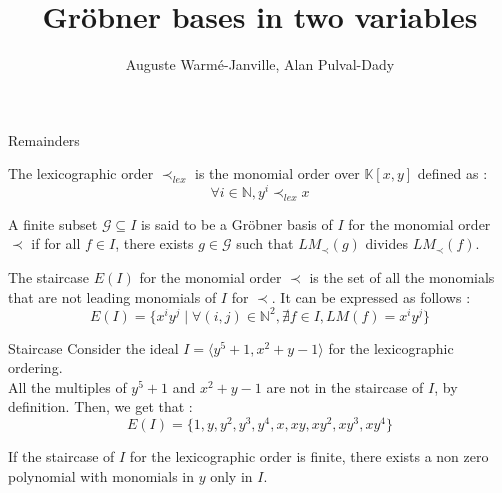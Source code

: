 \documentclass{beamer}
\title{Gröbner bases in two variables}
\author{Auguste Warmé-Janville, Alan Pulval-Dady}
\institute{Sorbonne Université}
\begin{document}
\frame{\titlepage}




\begin{frame}{Remainders}
    \begin{definition}\label{def:lexicographic-order}
        The lexicographic order $\prec_{lex}$ is the monomial order over $\mathbb{K}[x, y]$ defined as : 
        \begin{displaymath}
            \forall i \in \mathbb{N}, y^{i} \prec_{lex} x
        \end{displaymath}
    \end{definition}
    \begin{definition}
        A finite subset $\mathscr{G} \subseteq I$ is said to be a Gröbner basis of $I$ for the monomial order $\prec$ if for all $f \in I$, there exists $g \in \mathscr{G}$ such that $LM_{\prec}(g)$ divides $LM_{\prec}(f)$. 
    \end{definition}
    \begin{definition}[Staircase]
        The staircase $E(I)$ for the monomial order $\prec$ is the set of all the monomials that are not leading monomials of $I$ for $\prec$. It can be expressed as follows : 
        \begin{displaymath}
            E(I) = \{ x^{i}y^{j} \mid \forall (i, j) \in \mathbb{N}^{2}, \nexists f \in I, LM(f) = x^{i}y^{j}\}
        \end{displaymath}
    \end{definition}
\end{frame}

\begin{frame}{Staircase}
    Consider the ideal $I = \langle y^{5} + 1, x^2 + y - 1 \rangle$ for the lexicographic ordering. \\
    All the multiples of $y^{5} + 1$ and $x^2 + y - 1$ are not in the staircase of $I$, by definition. 
    Then, we get that : 
    \begin{displaymath}
        E(I) = \{ 1, y, y^{2}, y^{3}, y^{4}, x, xy, xy^{2}, xy^{3}, xy^{4} \}
    \end{displaymath}
    \begin{theorem} \label{th:polynomial-only-in-y}
        If the staircase of $I$ for the lexicographic order is finite, there exists a non zero polynomial with monomials in $y$ only in $I$.
    \end{theorem}
\end{frame}
\end{document}
